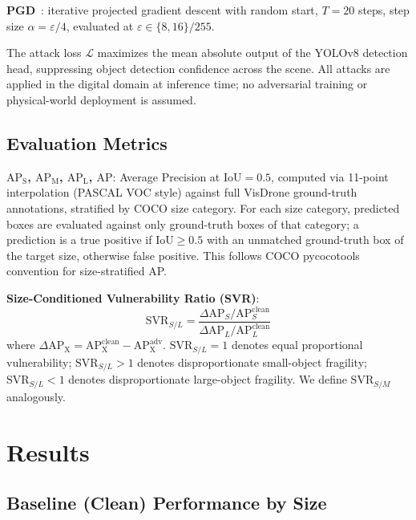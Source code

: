 \documentclass[journal]{IEEEtran}
\begin{document}
\textbf{PGD}~\cite{madry2018pgd}: iterative projected gradient
descent with random start, $T=20$ steps, step size
$\alpha=\varepsilon/4$, evaluated at
$\varepsilon \in \{8,16\}/255$.

The attack loss $\mathcal{L}$ maximizes the mean absolute
output of the YOLOv8 detection head, suppressing object
detection confidence across the scene.
All attacks are applied in the digital domain at inference time;
no adversarial training or physical-world deployment is assumed.

\subsection{Evaluation Metrics}

\textbf{$\text{AP}_\text{S}$, $\text{AP}_\text{M}$,
$\text{AP}_\text{L}$, $\text{AP}$}: Average Precision at
$\text{IoU}=0.5$, computed via 11-point interpolation
(PASCAL VOC style) against full VisDrone ground-truth annotations,
stratified by COCO size category.
For each size category, predicted boxes are evaluated against
only ground-truth boxes of that category; a prediction is a
true positive if $\text{IoU} \geq 0.5$ with an unmatched
ground-truth box of the target size, otherwise false positive.
This follows COCO pycocotools convention for size-stratified AP.

\textbf{Size-Conditioned Vulnerability Ratio (SVR)}:
\begin{equation}
  \text{SVR}_{S/L} =
  \frac{\Delta\text{AP}_S / \text{AP}_S^\text{clean}}
       {\Delta\text{AP}_L / \text{AP}_L^\text{clean}}
\label{eq:svr}
\end{equation}
where $\Delta\text{AP}_\text{X}
= \text{AP}_\text{X}^\text{clean}
- \text{AP}_\text{X}^\text{adv}$.
$\text{SVR}_{S/L} = 1$ denotes equal proportional vulnerability;
$\text{SVR}_{S/L} > 1$ denotes disproportionate small-object
fragility; $\text{SVR}_{S/L} < 1$ denotes disproportionate
large-object fragility.
We define $\text{SVR}_{S/M}$ analogously.

\section{Results}
\label{sec:results}

\subsection{Baseline (Clean) Performance by Size}
\end{document}
